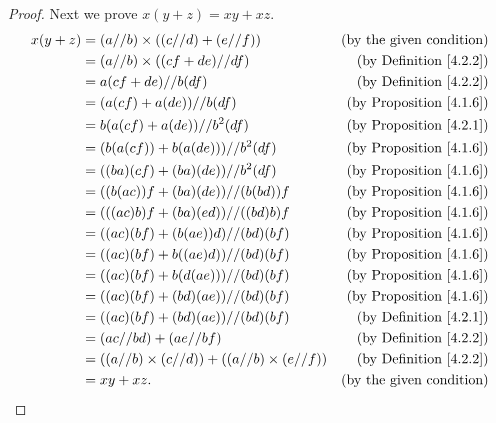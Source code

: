 \begin{proof}
    Next we prove \(x(y + z) = xy + xz\).
    \begin{align*}
        x(y + z) & = (a // b) \times ((c // d) + (e // f))                   & \text{(by the given condition)}     \\
                 & = (a // b) \times ((cf + de) // df)                       & \text{(by Definition \ref{4.2.2})}  \\
                 & = a(cf + de) // b(df)                                     & \text{(by Definition \ref{4.2.2})}  \\
                 & = (a(cf) + a(de)) // b(df)                                & \text{(by Proposition \ref{4.1.6})} \\
                 & = b(a(cf) + a(de)) // b^2(df)                             & \text{(by Proposition \ref{4.2.1})} \\
                 & = (b(a(cf)) + b(a(de))) // b^2(df)                        & \text{(by Proposition \ref{4.1.6})} \\
                 & = ((ba)(cf) + (ba)(de)) // b^2(df)                        & \text{(by Proposition \ref{4.1.6})} \\
                 & = ((b(ac))f + (ba)(de)) // (b(bd))f                       & \text{(by Proposition \ref{4.1.6})} \\
                 & = (((ac)b)f + (ba)(ed)) // ((bd)b)f                       & \text{(by Proposition \ref{4.1.6})} \\
                 & = ((ac)(bf) + (b(ae))d) // (bd)(bf)                       & \text{(by Proposition \ref{4.1.6})} \\
                 & = ((ac)(bf) + b((ae)d)) // (bd)(bf)                       & \text{(by Proposition \ref{4.1.6})} \\
                 & = ((ac)(bf) + b(d(ae))) // (bd)(bf)                       & \text{(by Proposition \ref{4.1.6})} \\
                 & = ((ac)(bf) + (bd)(ae)) // (bd)(bf)                       & \text{(by Proposition \ref{4.1.6})} \\
                 & = ((ac)(bf) + (bd)(ae)) // (bd)(bf)                       & \text{(by Definition \ref{4.2.1})}  \\
                 & = (ac // bd) + (ae // bf)                                 & \text{(by Definition \ref{4.2.2})}  \\
                 & = ((a // b) \times (c // d)) + ((a // b) \times (e // f)) & \text{(by Definition \ref{4.2.2})}  \\
                 & = xy + xz.                                                & \text{(by the given condition)}
    \end{align*}


\end{proof}
